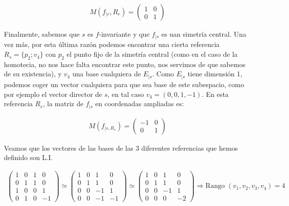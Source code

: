 \begin{gather*}
    M(f_{\mid r}, R_r) = 
    \begin{pmatrix}
    1 & 0\\
    0 & 1
    \end{pmatrix}
\end{gather*}

Finalmente, sabemos que $s$ es $f$-invariante y que $f_{\mid s}$ es uan simetría central. Una vez más, por esta última razón podemos encontrar una cierta referencia $R_s = \{p_2; v_4\}$ con $p_2$ el punto fijo de la simetría central (como en el caso de la homotecia, no nos hace falta encontrar este punto, nos servimos de que sabemos de su existencia), y $v_4$ una base cualquiera de $E_{\mid s}$. Como $E_{\mid s}$ tiene dimensión 1, podemos coger un vector cualquiera para que sea base de este subespacio, como por ejemplo el vector director de $s$, en tal caso $v_4 = (0,0,1,-1)$. En esta referencia $R_s$, la matriz de $f_{\mid s}$ en coordenadas ampliadas es:

\begin{gather*}
    M(f_{\mid s, R_s}) = 
    \begin{pmatrix}
    -1 & 0\\
    0 & 1
    \end{pmatrix}
\end{gather*}

Veamos que los vectores de las bases de las 3 diferentes referencias que hemos definido son L.I.

\begin{gather*}
    \begin{pmatrix}
    1 & 0 & 1 & 0\\
    0 & 1 & 1 & 0\\
    1 & 0 & 0 & 1\\
    0 & 1 & 0 & -1
    \end{pmatrix}
    \simeq
    \begin{pmatrix}
    1 & 0 & 1 & 0\\
    0 & 1 & 1 & 0\\
    0 & 0 & -1 & 1\\
    0 & 0 & -1 & -1
    \end{pmatrix}
    \simeq
    \begin{pmatrix}
    1 & 0 & 1 & 0\\
    0 & 1 & 1 & 0\\
    0 & 0 & -1 & 1\\
    0 & 0 & 0 & -2
    \end{pmatrix}
    \Longrightarrow \text{Rango }(v_1,v_2,v_3,v_4) = 4
\end{gather*}
\vspace{2mm}

